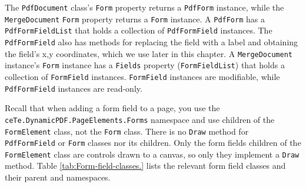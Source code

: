 \documentclass[american,letterpaper]{tufte-book}
\numberwithin{equation}{section}
\numberwithin{figure}{section}
\begin{document}
{{The \texttt{PdfDocument} class's \texttt{Form} property returns a
\texttt{PdfForm} instance, while the \texttt{MergeDocument} \texttt{Form}
property returns a \texttt{Form} instance.  A \texttt{PdfForm} has
a \texttt{PdfFormFieldList} that holds a collection of \texttt{PdfFormField}
instances. The \texttt{PdfFormField} also has methods for replacing
the field with a label and obtaining the field's x,y coordinates,
which we use later in this chapter. A \texttt{MergeDocument} instance's
\texttt{Form} instance has a \texttt{Fields} property (\texttt{FormFieldList})
that holds a collection of \texttt{FormField} instances. \texttt{FormField}
instances are modifiable, while \texttt{PdfFormField} instances are
read-only.

Recall that when adding a form field to a page, you use the\linebreak
 \texttt{ceTe.DynamicPDF.PageElements.Forms} namespace 
and use children of the \texttt{FormElement} class, not
the \texttt{Form} class. There is no \texttt{Draw} method for \texttt{PdfFormField}
or \texttt{Form} classes nor its children. Only the form fields children
of the \texttt{FormElement} class are controls drawn to a canvas,
so only they implement a \texttt{Draw} method. Table \ref{tab:Form-field-classes.}
lists the relevant form field classes and their parent and namespaces.

\begin{table}


\end{table}}}
\end{document}
